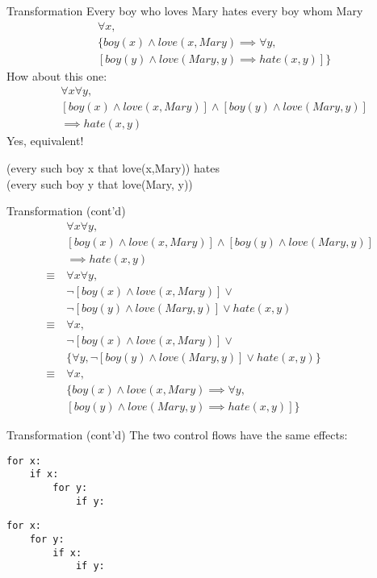 \documentclass{beamer}
\begin{document}
\begin{frame}{Transformation}
Every boy who loves Mary hates every boy whom Mary 
\[
	\begin{split}
		&\forall x, \\
		& \{boy(x) \land love(x, Mary) \implies \forall y, \\
		& [boy(y) \land love(Mary, y) \implies hate(x,y)]\}
	\end{split}
\]
\alert{
How about this one:
\[
\begin{split}
	&\forall x \forall y, \\
	& [boy(x) \land love(x, Mary)] \land [boy(y) \land love(Mary, y)] \\
	& \implies hate(x,y)	
\end{split}
\]
}
\pause
Yes, equivalent!

(every such boy x that love(x,Mary)) hates \\
(every such boy y that love(Mary, y))
\end{frame}

\begin{frame}{Transformation (cont'd)}
\vspace{-5mm}
\[
\begin{split}
	&\forall x \forall y, \\
	& [boy(x) \land love(x, Mary)] \land [boy(y) \land love(Mary, y)] \\
	& \implies hate(x,y)	 \\
\equiv\
 & \forall x \forall y, \\
	&\neg[boy(x) \land love(x, Mary)] \lor \\
	&\neg[boy(y) \land love(Mary, y)] \lor hate(x,y) \\
\equiv\
& \forall x, \\ 
& \neg[boy(x) \land love(x, Mary)] \lor \\
& \{\forall y, \neg[boy(y) \land love(Mary, y)] \lor hate(x,y)\} \\
\equiv\
& \forall x, \\
	&\{boy(x) \land love(x, Mary) \implies \forall y,\\ 
	& [boy(y) \land love(Mary, y) \implies hate(x,y)]\}
\end{split}
\]
\end{frame}

\begin{frame}[fragile=singleslide]{Transformation (cont'd)}
The two control flows have the same effects:
\begin{verbatim}
for x:
    if x:
        for y:
            if y:	
\end{verbatim}
\begin{verbatim}
for x:
    for y:
        if x:
            if y:	
\end{verbatim}
\end{frame}
\end{document}
